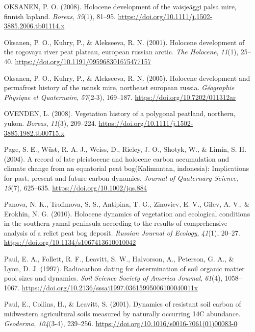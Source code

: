 \documentclass[]{article}
\begin{document}
\leavevmode\hypertarget{ref-OKSANEN_2008}{}%
OKSANEN, P. O. (2008). Holocene development of the vaisjeäggi palsa
mire, finnish lapland. \emph{Boreas}, \emph{35}(1), 81--95.
\url{https://doi.org/10.1111/j.1502-3885.2006.tb01114.x}

\leavevmode\hypertarget{ref-Oksanen_2001}{}%
Oksanen, P. O., Kuhry, P., \& Alekseeva, R. N. (2001). Holocene
development of the rogovaya river peat plateau, european russian arctic.
\emph{The Holocene}, \emph{11}(1), 25--40.
\url{https://doi.org/10.1191/095968301675477157}

\leavevmode\hypertarget{ref-Oksanen_2005}{}%
Oksanen, P. O., Kuhry, P., \& Alekseeva, R. N. (2005). Holocene
development and permafrost history of the usinsk mire, northeast
european russia. \emph{Géographie Physique et Quaternaire},
\emph{57}(2-3), 169--187. \url{https://doi.org/10.7202/011312ar}

\leavevmode\hypertarget{ref-OVENDEN_2008}{}%
OVENDEN, L. (2008). Vegetation history of a polygonal peatland,
northern, yukon. \emph{Boreas}, \emph{11}(3), 209--224.
\url{https://doi.org/10.1111/j.1502-3885.1982.tb00715.x}

\leavevmode\hypertarget{ref-Page_2004}{}%
Page, S. E., Wűst, R. A. J., Weiss, D., Rieley, J. O., Shotyk, W., \&
Limin, S. H. (2004). A record of late pleistocene and holocene carbon
accumulation and climate change from an equatorial peat bog(Kalimantan,
indonesia): Implications for past, present and future carbon dynamics.
\emph{Journal of Quaternary Science}, \emph{19}(7), 625--635.
\url{https://doi.org/10.1002/jqs.884}

\leavevmode\hypertarget{ref-Panova_2010}{}%
Panova, N. K., Trofimova, S. S., Antipina, T. G., Zinoviev, E. V.,
Gilev, A. V., \& Erokhin, N. G. (2010). Holocene dynamics of vegetation
and ecological conditions in the southern yamal peninsula according to
the results of comprehensive analysis of a relict peat bog deposit.
\emph{Russian Journal of Ecology}, \emph{41}(1), 20--27.
\url{https://doi.org/10.1134/s1067413610010042}

\leavevmode\hypertarget{ref-Paul_1997}{}%
Paul, E. A., Follett, R. F., Leavitt, S. W., Halvorson, A., Peterson, G.
A., \& Lyon, D. J. (1997). Radiocarbon dating for determination of soil
organic matter pool sizes and dynamics. \emph{Soil Science Society of
America Journal}, \emph{61}(4), 1058--1067.
\url{https://doi.org/10.2136/sssaj1997.03615995006100040011x}

\leavevmode\hypertarget{ref-Paul_2001}{}%
Paul, E., Collins, H., \& Leavitt, S. (2001). Dynamics of resistant soil
carbon of midwestern agricultural soils measured by naturally occurring
14C abundance. \emph{Geoderma}, \emph{104}(3-4), 239--256.
\url{https://doi.org/10.1016/s0016-7061(01)00083-0}
\end{document}
